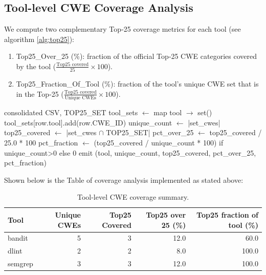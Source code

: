 \subsection{Tool-level CWE Coverage Analysis}


We compute two complementary Top‑25 coverage metrics for each tool (see algorithm \ref{alg:top25}):

\begin{enumerate}
  \item Top25\_Over\_25 (\%): fraction of the official Top‑25 CWE categories covered by the tool ($\frac{\text{Top25 covered}}{25}\times 100$).
  \item Top25\_Fraction\_Of\_Tool (\%): fraction of the tool's unique CWE set that is in the Top‑25 ($\frac{\text{Top25 covered}}{\text{Unique CWEs}}\times 100$).
\end{enumerate}

\begin{algorithm}[H]
\caption{Compute per-tool sets and Top‑25 metrics}
\begin{algorithmic}[1]
\label{alg:top25}
\REQUIRE consolidated CSV, TOP25\_SET
\STATE tool\_sets $\leftarrow$ map tool $\to$ set()
  \STATE tool\_sets[row.tool].add(row.CWE\_ID)
\ENDFOR
{}
  \STATE unique\_count $\leftarrow$ |set\_cwes|
  \STATE top25\_covered $\leftarrow$ |set\_cwes $\cap$ TOP25\_SET|
  \STATE pct\_over\_25 $\leftarrow$ top25\_covered / 25.0 * 100
  \STATE pct\_fraction $\leftarrow$ (top25\_covered / unique\_count * 100) if unique\_count>0 else 0
  \STATE emit (tool, unique\_count, top25\_covered, pct\_over\_25, pct\_fraction)
\ENDFOR
\end{algorithmic}
\end{algorithm}

Shown below is the Table of coverage analysis implemented as stated above:


\begin{table}[H]
\centering
\begin{tabular}{lrrrr}
\toprule
Tool & Unique CWEs & Top25 Covered & Top25 over 25 (\%) & Top25 fraction of tool (\%) \\
\midrule
bandit  & 5 & 3 & 12.0 & 60.0 \\
dlint   & 2 & 2 & 8.0  & 100.0 \\
semgrep & 3 & 3 & 12.0 & 100.0 \\
\bottomrule
\end{tabular}
\caption{Tool-level CWE coverage summary.}
\label{tab:tool_coverage}
\end{table}

